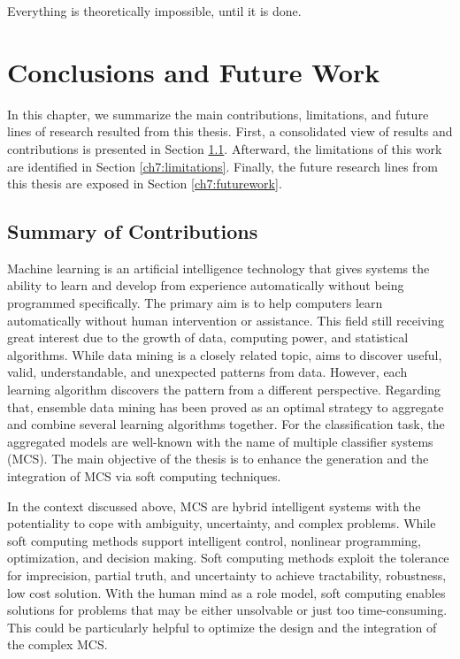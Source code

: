 


\begin{savequote}[50mm]
Everything is theoretically impossible, until it is done.
\end{savequote}

\chapter{Conclusions and Future Work}
\label{cha:7_Conclusions}
In this chapter, we summarize the main contributions, limitations, and future lines of research resulted from this thesis. First, a consolidated view of results and
contributions is presented in Section \ref{ch7:contributions}. Afterward, the limitations of this work are identified in Section \ref{ch7:limitations}. Finally, the future research lines from this thesis are exposed in Section \ref{ch7:futurework}.



\section{Summary of Contributions} \label{ch7:contributions}
Machine learning is an artificial intelligence technology that gives systems the ability to learn and develop from experience automatically without being programmed specifically. The primary aim is to help computers learn automatically without human intervention or assistance. This field still receiving great interest due to the growth of data, computing power, and statistical algorithms. While data mining is a closely related topic, aims to discover useful, valid, understandable, and unexpected patterns from data. However, each learning algorithm discovers the pattern from a different perspective. Regarding that, ensemble data mining has been proved as an optimal strategy to aggregate and combine several learning algorithms together. For the classification task, the aggregated models are well-known with the name of multiple classifier systems (MCS). The main objective of the thesis is to enhance the generation and the integration of MCS via soft computing techniques. 



In the context discussed above, MCS are hybrid intelligent systems with the potentiality to cope with ambiguity, uncertainty, and complex problems. While soft computing methods support intelligent control, nonlinear programming, optimization, and decision making. Soft computing methods exploit the tolerance for imprecision, partial truth, and uncertainty to achieve tractability, robustness, low cost solution. With the human mind as a role model, soft computing enables solutions for problems that may be either unsolvable or just too time-consuming. This could be particularly helpful to optimize the design and the integration of the complex MCS.

